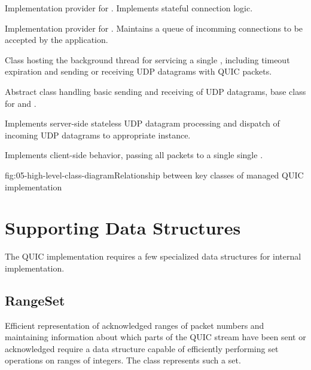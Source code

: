 \begin{itemize}

  \litem[]{\ManagedQuicConnection{}} Implementation provider for \QuicConnection{}. Implements stateful connection logic.

  \litem[]{\ManagedQuicListener{}} Implementation provider for \QuicListener{}. Maintains a queue of incomming connections to be accepted by the application.

  \litem[]{\QuicConnectionContext{}} Class hosting the background thread for servicing a single \ManagedQuicConnection{}, including timeout expiration and sending or receiving UDP datagrams with QUIC packets.

  \litem[]{\QuicSocketContext{}} Abstract class handling basic sending and receiving of UDP datagrams, base class for \QuicClientSocketContext{} and \QuicServerSocketContext{}.

  \litem[]{\QuicServerSocketContext{}} Implements server-side stateless UDP datagram processing and dispatch of incoming UDP datagrams to appropriate \QuicConnectionContext{} instance.

  \litem[]{\QuicClientSocketContext{}} Implements client-side \QuicSocketContext{} behavior, passing all packets to a single single \QuicConnectionContext{}.

\end{itemize}

\begin{myFigure}{fig:05-high-level-class-diagram}{Relationship between key classes of managed QUIC implementation}

\resizebox{\linewidth}{!}{}

\end{myFigure}

\section{Supporting Data Structures}

The QUIC implementation requires a few specialized data structures for internal implementation.

\subsection{RangeSet}

Efficient representation of acknowledged ranges of packet numbers and maintaining information about
which parts of the QUIC stream have been sent or acknowledged require a data structure capable of
efficiently performing set operations on ranges of integers. The \RangeSet{} class represents such a
set.

